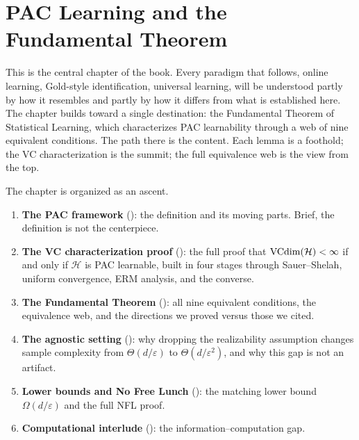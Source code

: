 

\chapter{PAC Learning and the Fundamental Theorem}
\label{ch:pac}

This is the central chapter of the book.  Every paradigm that follows, online
learning, Gold-style identification, universal learning, will be understood
partly by how it resembles and partly by how it differs from what is
established here.  The chapter builds toward a single destination: the
Fundamental Theorem of Statistical Learning, which characterizes PAC
learnability through a web of nine equivalent conditions.  The path there is
the content.  Each lemma is a foothold; the VC characterization is the summit;
the full equivalence web is the view from the top.

\medskip

The chapter is organized as an ascent.

\begin{enumerate}[leftmargin=*,itemsep=2pt]
\item \textbf{The PAC framework} (): the definition and its
  moving parts.  Brief, the definition is not the centerpiece.
\item \textbf{The VC characterization proof} (): the full
  proof that $\mathrm{VCdim}(\mathcal{H}) < \infty$ if and only if $\mathcal{H}$ is PAC
  learnable, built in four stages through Sauer--Shelah, uniform convergence,
  ERM analysis, and the converse.
\item \textbf{The Fundamental Theorem} (): all nine
  equivalent conditions, the equivalence web, and the directions we proved versus
  those we cited.
\item \textbf{The agnostic setting} (): why dropping the
  realizability assumption changes sample complexity from $\Theta(d/\varepsilon)$
  to $\Theta(d/\varepsilon^2)$, and why this gap is not an artifact.
\item \textbf{Lower bounds and No Free Lunch} (): the
  matching lower bound $\Omega(d/\varepsilon)$ and the full NFL proof.
\item \textbf{Computational interlude} (): the
  information--computation gap.
\end{enumerate}


